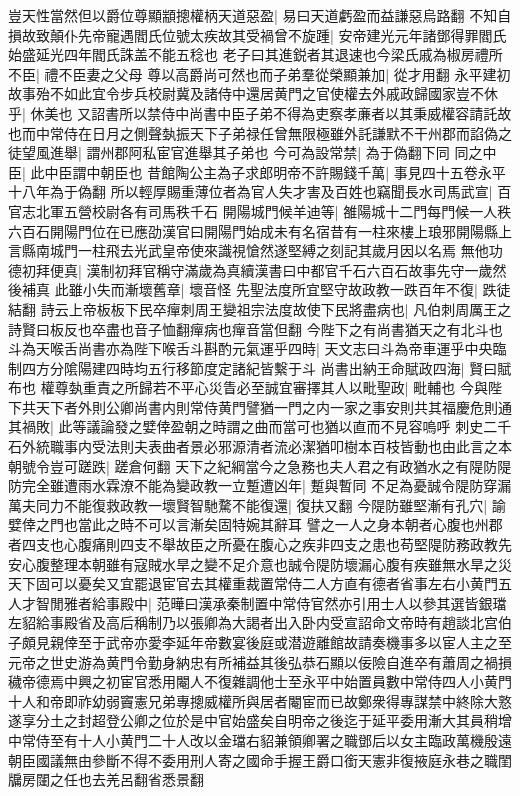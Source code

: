 豈天性當然但以爵位尊顯顓摠權柄天道惡盈|{
	易曰天道虧盈而益謙惡烏路翻}
不知自損故致顛仆先帝寵遇閻氏位號太疾故其受禍曾不旋踵|{
	安帝建光元年諸鄧得罪閻氏始盛延光四年閻氏誅盖不能五稔也}
老子曰其進鋭者其退速也今梁氏戚為椒房禮所不臣|{
	禮不臣妻之父母}
尊以高爵尚可然也而子弟羣從榮顯兼加|{
	從才用翻}
永平建初故事殆不如此宜令步兵校尉冀及諸侍中還居黄門之官使權去外戚政歸國家豈不休乎|{
	休美也}
又詔書所以禁侍中尚書中臣子弟不得為吏察孝亷者以其秉威權容請託故也而中常侍在日月之側聲埶振天下子弟禄任曾無限極雖外託謙默不干州郡而諂偽之徒望風進舉|{
	謂州郡阿私宦官進舉其子弟也}
今可為設常禁|{
	為于偽翻下同}
同之中臣|{
	此中臣謂中朝臣也}
昔館陶公主為子求郎明帝不許賜錢千萬|{
	事見四十五卷永平十八年為于偽翻}
所以輕厚賜重薄位者為官人失才害及百姓也竊聞長水司馬武宣|{
	百官志北軍五營校尉各有司馬秩千石}
開陽城門候羊迪等|{
	雒陽城十二門每門候一人秩六百石開陽門位在已應劭漢官曰開陽門始成未有名宿昔有一柱來樓上琅邪開陽縣上言縣南城門一柱飛去光武皇帝使來識視愴然遂堅縛之刻記其歲月因以名焉}
無他功德初拜便真|{
	漢制初拜官稱守滿歲為真續漢書曰中都官千石六百石故事先守一歲然後補真}
此雖小失而漸壞舊章|{
	壞音怪}
先聖法度所宜堅守故政教一跌百年不復|{
	跌徒結翻}
詩云上帝板板下民卒癉刺周王變祖宗法度故使下民將盡病也|{
	凡伯刺周厲王之詩賢曰板反也卒盡也音子恤翻癉病也癉音當但翻}
今陛下之有尚書猶天之有北斗也斗為天喉舌尚書亦為陛下喉舌斗斟酌元氣運乎四時|{
	天文志曰斗為帝車運乎中央臨制四方分隂陽建四時均五行移節度定諸紀皆繫于斗}
尚書出納王命賦政四海|{
	賢曰賦布也}
權尊埶重責之所歸若不平心災眚必至誠宜審擇其人以毗聖政|{
	毗輔也}
今與陛下共天下者外則公卿尚書内則常侍黄門譬猶一門之内一家之事安則共其福慶危則通其禍敗|{
	此等議論發之嬖倖盈朝之時謂之曲而當可也猶以直而不見容嗚呼}
刺史二千石外統職事内受法則夫表曲者景必邪源清者流必潔猶叩樹本百枝皆動也由此言之本朝號令豈可蹉跌|{
	蹉倉何翻}
天下之紀綱當今之急務也夫人君之有政猶水之有隄防隄防完全雖遭雨水霖潦不能為變政教一立蹔遭凶年|{
	蹔與暫同}
不足為憂誠令隄防穿漏萬夫同力不能復救政教一壞賢智馳騖不能復還|{
	復扶又翻}
今隄防雖堅漸有孔穴|{
	諭嬖倖之門也當此之時不可以言漸矣固特婉其辭耳}
譬之一人之身本朝者心腹也州郡者四支也心腹痛則四支不舉故臣之所憂在腹心之疾非四支之患也苟堅隄防務政教先安心腹整理本朝雖有寇賊水旱之變不足介意也誠令隄防壞漏心腹有疾雖無水旱之災天下固可以憂矣又宜罷退宦官去其權重裁置常侍二人方直有德者省事左右小黄門五人才智閒雅者給事殿中|{
	范曄曰漢承秦制置中常侍官然亦引用士人以參其選皆銀璫左貂給事殿省及高后稱制乃以張卿為大謁者出入卧内受宣詔命文帝時有趙談北宫伯子頗見親倖至于武帝亦愛李延年帝數宴後庭或潜遊離館故請奏機事多以宦人主之至元帝之世史游為黄門令勤身納忠有所補益其後弘恭石顯以佞險自進卒有蕭周之禍損穢帝德焉中興之初宦官悉用閹人不復雜調他士至永平中始置員數中常侍四人小黄門十人和帝即祚幼弱竇憲兄弟專摠威權所與居者閹宦而已故鄭衆得專謀禁中終除大憝遂享分土之封超登公卿之位於是中官始盛矣自明帝之後迄于延平委用漸大其員稍增中常侍至有十人小黄門二十人改以金璫右貂兼領卿署之職鄧后以女主臨政萬機殷遠朝臣國議無由參斷不得不委用刑人寄之國命手握王爵口銜天憲非復掖庭永巷之職閨牖房闥之任也去羌呂翻省悉景翻}

